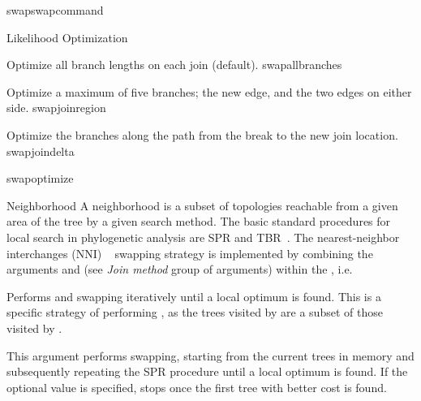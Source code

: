 \begin{command}{swap}{swapcommand}
\begin{arguments}
\begin{argumentgroup}{Likelihood Optimization}
{{\begin{description}
                        {Optimize all branch lengths on each join (default).}
                        {swapallbranches}

                        {Optimize a maximum of five branches; the new edge, and the two
                        edges on either side.}
                        {swapjoinregion}

                        {Optimize the branches along the path from the break to the
                        new join location.}
                        {swapjoindelta}

                \end{description} 
		 }  {swapoptimize}
                }
             

        \end{argumentgroup}

	    \begin{argumentgroup}{Neighborhood}
	        {A neighborhood is a subset of topologies reachable from a given 
	        area of the tree by a given search method. The basic standard procedures for 
	        local search in phylogenetic analysis are SPR and TBR~\cite{swofford1990}. 
	        The nearest-neighbor interchanges (NNI) ~\cite{camin1965} swapping strategy is implemented 
	        by combining the arguments  and 
	        (see \emph{Join method} group of arguments) within the , 
	        i.e. 
            }
            \label{swap_neigh}

	       {Performs  and 
                swapping iteratively until a local optimum is found.
                This is a specific strategy of performing ,
                as the trees visited by  are a subset
                of those visited by .}
                {}

	        {This argument performs  swapping, starting
                from the current trees in memory and subsequently repeating
                the SPR procedure until  a local optimum is found. If the optional value
                 is specified,  
                stops once the first tree with better cost is found.} 
                {}


\end{argumentgroup}
\end{arguments}
\end{command}
